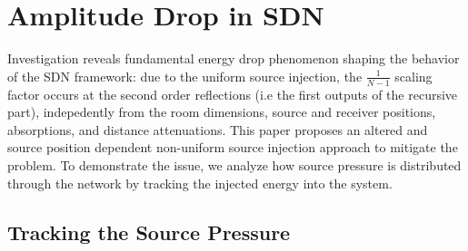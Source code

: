 \documentclass[journal]{IEEEtran}
\begin{document}

\section{Amplitude Drop in SDN}
\label{sec:energy_drop_problem}

Investigation reveals fundamental energy drop phenomenon shaping the behavior of the SDN framework: due to the uniform source injection, the \(\frac{1}{N-1}\) scaling factor occurs at the second order reflections (i.e the first outputs of the recursive part), indepedently from the room dimensions, source and receiver positions, absorptions, and distance attenuations. This paper proposes an altered and source position dependent non-uniform source injection approach to mitigate the problem. To demonstrate the issue, we analyze how source pressure is distributed through the network by tracking the injected energy into the system.

\subsection{Tracking the Source Pressure}
\label{sec:pressure_distribution}
\end{document}
